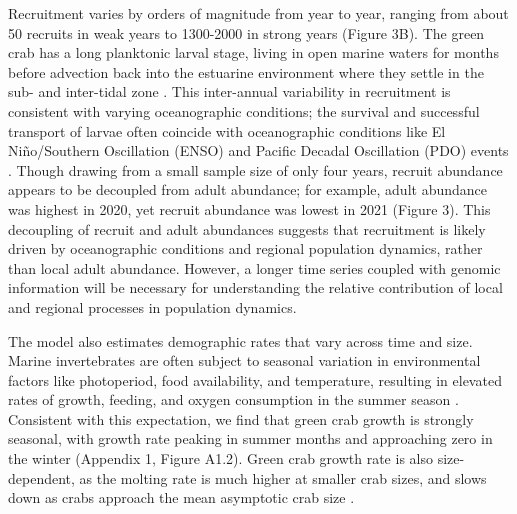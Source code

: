 \documentclass{article}
\begin{document}
Recruitment varies by orders of magnitude from year to year, ranging from about 50 recruits in weak years to 1300-2000 in strong years (Figure 3B). The green crab has a long planktonic larval stage, living in open marine waters for months before advection back into the estuarine environment where they settle in the sub- and inter-tidal zone \parencite{yamada2001global}. This inter-annual variability in recruitment is consistent with varying oceanographic conditions; the survival and successful transport of larvae often coincide with oceanographic conditions like El Niño/Southern Oscillation (ENSO) and Pacific Decadal Oscillation (PDO) events \parencite{yamada2021ocean}. Though drawing from a small sample size of only four years, recruit abundance appears to be decoupled from adult abundance; for example, adult abundance was highest in 2020, yet recruit abundance was lowest in 2021 (Figure 3). This decoupling of recruit and adult abundances suggests that recruitment is likely driven by oceanographic conditions and regional population dynamics, rather than local adult abundance. However, a longer time series coupled with genomic information will be necessary for understanding the relative contribution of local and regional processes in population dynamics.

The model also estimates demographic rates that vary across time and size. Marine invertebrates are often subject to seasonal variation in environmental factors like photoperiod, food availability, and temperature, resulting in elevated rates of growth, feeding, and oxygen consumption in the summer season \parencite{brockington2001relative}. Consistent with this expectation, we find that green crab growth is strongly seasonal, with growth rate peaking in summer months and approaching zero in the winter (Appendix 1, Figure A1.2). Green crab growth rate is also size-dependent, as the molting rate is much higher at smaller crab sizes, and slows down as crabs approach the mean asymptotic crab size \parencite{yamada2005growth}.
\end{document}
